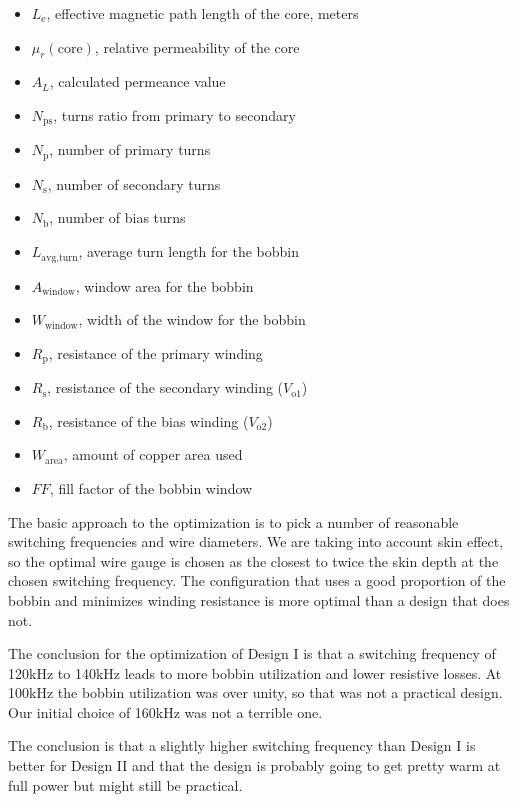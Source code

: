 \documentclass{article}
\begin{document}
\begin{itemize}
    \item $L_\text{e}$, effective magnetic path length of the core, meters
    \item $\mu_r (\text{core})$, relative permeability of the core
    \item $A_L$, calculated permeance value
    \item $N_\text{ps}$, turns ratio from primary to secondary
    \item $N_\text{p}$, number of primary turns
    \item $N_\text{s}$, number of secondary turns
    \item $N_\text{b}$, number of bias turns
    \item $L_\text{avg,turn}$, average turn length for the bobbin
    \item $A_\text{window}$, window area for the bobbin
    \item $W_\text{window}$, width of the window for the bobbin
    \item $R_\text{p}$, resistance of the primary winding
    \item $R_\text{s}$, resistance of the secondary winding ($V_\text{o1}$)
    \item $R_\text{b}$, resistance of the bias winding ($V_\text{o2}$)
    \item $W_\text{area}$, amount of copper area used
    \item $FF$, fill factor of the bobbin window
\end{itemize}

The basic approach to the optimization is to pick a number of reasonable switching frequencies and wire diameters.  We are taking into account skin effect, so the optimal wire gauge is chosen as the closest to twice the skin depth at the chosen switching frequency.  The configuration that uses a good proportion of the bobbin and minimizes winding resistance is more optimal than a design that does not.


The conclusion for the optimization of Design I is that a switching frequency of 120kHz to 140kHz leads to more bobbin utilization and lower resistive losses.  At 100kHz the bobbin utilization was over unity, so that was not a practical design.  Our initial choice of 160kHz was not a terrible one.


The conclusion is that a slightly higher switching frequency than Design I is better for Design II and that the design is probably going to get pretty warm at full power but might still be practical.
\end{document}

